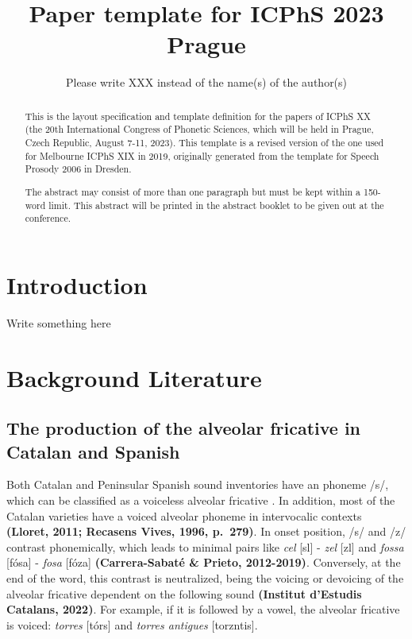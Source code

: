 \documentclass[
  a4paper,
  11pt,
  twocolumn]{article}
\author{}
\date{\vspace{-2.5em}}
\begin{document}
\title{Paper template for {ICPhS} 2023 Prague}
\author{Please write XXX instead of the name(s) of the author(s)}


\maketitle

\begin{abstract}
This is the layout specification and template definition for the papers of ICPhS XX (the 20th International Congress of Phonetic Sciences, which will be held in Prague, Czech Republic, August 7-11, 2023). 
This template is a revised version of the one used for Melbourne ICPhS XIX in 2019, originally generated from the template for Speech Prosody 2006 in Dresden.

The abstract may consist of more than one paragraph but must be kept within a 150-word limit. 
This abstract will be printed in the abstract booklet to be given out at the conference.
\end{abstract}



\section{Introduction}

Write something here

\section{Background Literature}

\subsection{The production of the alveolar fricative in Catalan and Spanish}

Both Catalan and Peninsular Spanish sound inventories have an phoneme
/s/, which can be classified as a voiceless alveolar fricative
\cite{hualde_colina_2015}. In addition, most of the Catalan varieties
have a voiced alveolar phoneme in intervocalic contexts \textbf{(Lloret,
2011; Recasens Vives, 1996, p.~279)}. In onset position, /s/ and /z/
contrast phonemically, which leads to minimal pairs like \emph{cel}
{[}s\textepsilon l{]} - \emph{zel} {[}z\textepsilon l{]} and
\emph{fossa} {[}fósa{]} - \emph{fosa} {[}fóza{]} \textbf{(Carrera-Sabaté
\& Prieto, 2012-2019)}. Conversely, at the end of the word, this
contrast is neutralized, being the voicing or devoicing of the alveolar
fricative dependent on the following sound \textbf{(Institut d'Estudis
Catalans, 2022)}. For example, if it is followed by a vowel, the
alveolar fricative is voiced: \emph{torres} {[}tór\textschwa{}s{]} and
\emph{torres antigues}
{[}tor\textschwa{}z\textschwa{}nti\textgamma{}\textschwa{}s{]}.
\end{document}
